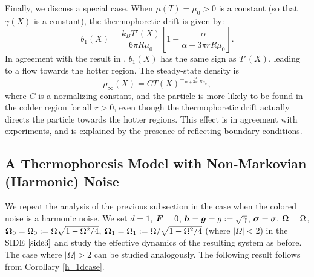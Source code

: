 
Finally, we discuss a special case. When $\mu(T)=\mu_{0} > 0$ is a constant (so that  $\gamma(X)$ is a constant), the thermophoretic drift is given by:
\begin{equation}b_{1}(X) = \frac{k_{B}T'(X)}{6 \pi R \mu_{0}} \left[1 - \frac{\alpha}{\alpha + 3 \pi r R  \mu_{0}} \right].\end{equation} In agreement with the result in \cite{Hottovy2012a}, $b_{1}(X)$ has the same sign as $T'(X)$, leading to 
a flow towards the hotter region. The steady-state density is \begin{equation}\rho_{\infty}(X) = C T(X)^{-\frac{\alpha}{\alpha + 3 \pi r R  \mu_{0}}},\end{equation} where $C$ is a normalizing constant, and the particle is more likely to be found in the colder region for all $r > 0$, even though the  thermophoretic drift actually directs the particle towards the hotter regions.  This effect is in agreement with experiments, and is explained by the presence of reflecting boundary conditions.


\subsection{A Thermophoresis Model with Non-Markovian (Harmonic) Noise}

We repeat the analysis of the previous subsection in the case when the colored noise is a harmonic noise. We set $d=1$, $\boldsymbol{F} = 0$, $\boldsymbol{h} = \boldsymbol{g} = g := \sqrt{\gamma}$, $\boldsymbol{\sigma} = \sigma$, $\boldsymbol{\Omega} = \Omega$, $\boldsymbol{\Omega}_0 = \Omega_0 := \Omega \sqrt{1-\Omega^2/4}$, $\boldsymbol{\Omega}_1 = \Omega_1 := \Omega/\sqrt{1-\Omega^2/4}$ (where $|\Omega|<2$) in the SIDE $\eqref{side3}$ and study the effective dynamics of the resulting system as before. The case where $|\Omega|>2$ can be studied analogously. The following result follows from Corollary \ref{h_1dcase}.

